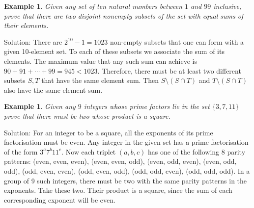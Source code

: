 \documentclass[11pt, openany]{book}
\theoremstyle{change} \theoremheaderfont{\blue\sffamily\bfseries}
\newtheorem{exa}[thm]{Example}
\theoremstyle{nonumberplain} \theoremheaderfont{\sffamily\bfseries}
\newcommand{\í}{\'{\i}}
\begin{document}
\begin{exa} Given any set of ten natural numbers between $1$ and $99$
inclusive, prove that there are two disjoint nonempty subsets of the
set with equal sums of their elements. \end{exa} Solution: There are
$2^{10} - 1 = 1023$ non-empty subsets that one can form with a given
10-element set. To each of these subsets we associate the sum of its
elements. The maximum value that any such sum can achieve is $90 +
91 + \cdots + 99 = 945 < 1023.$ Therefore, there must be at least
two different subsets $S, T$ that have the same element sum. Then $S
\setminus (S \cap T)$ and $T \setminus (S \cap T)$ also have the
same element sum.
\begin{exa}
Given any $9$ integers whose prime factors lie in the set $\{3, 7,
11 \}$ prove that there must be two whose product is a square.
\end{exa}
Solution: For an integer to be a square, all the exponents of its
prime factorisation must be even. Any integer in the given set has
a prime factorisation of the form $3^a7^b11^c$. Now each triplet
$(a, b, c)$ has one of the following 8 parity patterns: (even,
even, even), (even, even, odd), (even, odd, even), (even, odd,
odd), (odd, even, even), (odd, even, odd), (odd, odd, even), (odd,
odd, odd). In a group of 9 such integers, there must be two with
the same parity patterns in the exponents. Take these two. Their
product is a square, since the sum of each corresponding exponent
will be even.
\end{document}
